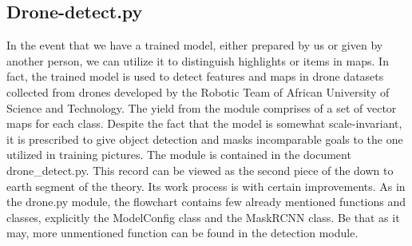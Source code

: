 \subsection{Drone-detect.py}
In the event that we have a trained model, either prepared by us or given by another person, we can utilize it to distinguish highlights or items in maps. In fact, the trained model is used to detect features and maps in drone datasets collected from drones developed by the Robotic Team of African University of Science and Technology.  The yield from 
the module comprises of a set of vector maps for each class. Despite the fact that the model is somewhat scale-invariant, it is prescribed to give object detection and masks incomparable 
goals to the one utilized in training pictures.  The module is contained in the document drone\_detect.py. This record can be viewed as the second piece of the down to earth 
segment of the theory. Its work process is with certain improvements. As in the drone.py module, the flowchart contains few already mentioned 
functions and classes, explicitly the ModelConfig class  and the MaskRCNN class. Be that as it may, more unmentioned function can be found in the detection module.  

